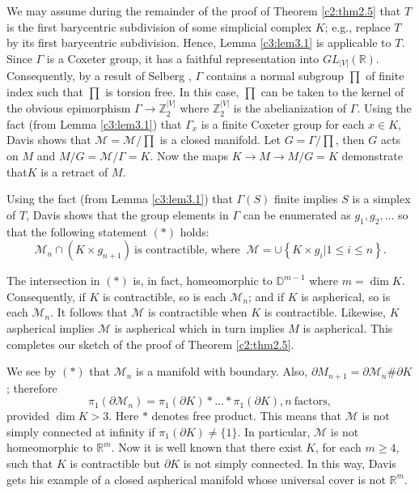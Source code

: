 \begin{step}\label{c3:step4}
  We may assume during the remainder of the proof of Theorem
  \ref{c2:thm2.5} that $T$ is the first barycentric subdivision of
  some simplicial complex $K$; e.g., replace $T$ by its first
  barycentric subdivision. Hence, Lemma \ref{c3:lem3.1} is applicable
  to $T$. Since $\Gamma$ is a Coxeter group, it has a faithful
  representation into $GL_{|V|}(\mathbb{R})$. Consequently, by a
  result of Selberg \cite{87}, $\Gamma$ contains a normal subgroup
  $\prod$ of finite index such that $\prod$ is torsion free. In this
  case, $\prod$ can be taken to the kernel of the obvious epimorphism
  $\Gamma \to \mathbb{Z}_2^{|V|}$ where $\mathbb{Z}_2^{|V|}$ is the
  abelianization of $\Gamma$. Using the fact (from Lemma
  \ref{c3:lem3.1}) that $\Gamma _x$ is a finite Coxeter group for each
  $x \in K$, Davis shows that $\mathcal{M}= \mathcal{M} / \prod$ is a
  closed manifold. Let $G= \Gamma/\prod$, then $G$ acts on $M$ and
  $M/G= \mathcal{M}/\Gamma=K$. Now the maps $K \to M \to M/G=K$
  demonstrate that\pageoriginale $K$ is a retract of $M$.
\end{step}

\begin{step}\label{c3:step5}
  Using the fact (from Lemma \ref{c3:lem3.1}) that $\Gamma (S)$ finite
  implies $S$ is a simplex of $T$, Davis shows that the group elements
  in $\Gamma$ can be enumerated as $g_1, g_2, \ldots $ so that the
  following statement $(*)$ holds:
  \begin{equation*}
    \mathcal{M}_n \cap (K \times g_{n+1}) ~\text{is contractible,
      where }~ \mathcal{M} = \cup \left\{K \times g_i | 1 \leq i \leq
    n \right\}. \tag{$*$}
  \end{equation*}
\end{step}

The intersection in $(*)$ is, in fact, homeomorphic to
$\mathbb{D}^{m-1}$ where $m = \dim K$. Consequently, if $K$ is
contractible, so is each $\mathcal{M}_n$; and if $K$ is aspherical, so
is each $\mathcal{M}_n$. It follows that $\mathcal{M}$ is contractible
when $K$ is contractible. Likewise, $K$ aspherical implies
$\mathcal{M}$ is aspherical which in turn implies $M$ is
aspherical. This completes our sketch of the proof of Theorem
\ref{c2:thm2.5}. 

\begin{remark}\label{c3:rem1}
  We see by $(*)$ that $\mathcal{M}_n$ is a manifold with
  boundary. Also, $\partial M_{n+1}= \partial \mathcal{M}_n \#
  \partial K$; therefore
  $$
  \pi_1 (\partial \mathcal{M}_n) = \pi_1 (\partial K)* \ldots * \pi_1
  (\partial K), n ~\text{factors},
  $$
  provided $\dim K > 3$. Here $*$ denotes free product. This means
  that $\mathcal{M}$ is not simply connected at infinity if $\pi_1
  (\partial K)\neq \{ 1\}$. In particular, $\mathcal{M}$ is not
  homeomorphic to $\mathbb{R}^m$. Now it is well known that there
  exist $K$, for each $m \geq 4$, such that $K$ is contractible but
  $\partial K$ is not simply connected. In this way, Davis \cite{21}
  gets his example of a closed aspherical manifold whose universal
  cover is not $\mathbb{R}^m$.
\end{remark}


